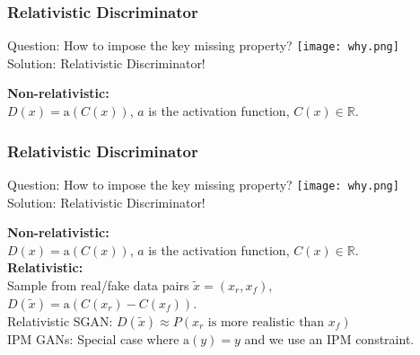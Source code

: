 \documentclass[t]{beamer}
\begin{document}
\begin{frame}
	\frametitle{Relativistic Discriminator}
	Question: How to impose the key missing property? \texttt{[image: why.png]} \\
	Solution: Relativistic Discriminator! \vspace{.25cm}
	
	\textbf{Non-relativistic:} \\ $D(x)=\text{a}(C(x))$, $a$ is the activation function, $C(x) \in \mathbb{R}$. \\ \vspace{.10cm}
	
\end{frame}


\begin{frame}
	\frametitle{Relativistic Discriminator}
	Question: How to impose the key missing property? \texttt{[image: why.png]} \\
	Solution: Relativistic Discriminator! \vspace{.25cm}
	
	\textbf{Non-relativistic:} \\ $D(x)=\text{a}(C(x))$, $a$ is the activation function, $C(x) \in \mathbb{R}$. \\ \vspace{.10cm}
	\textbf{Relativistic:} \\ Sample from real/fake data pairs $\tilde{x}=(x_r,x_f)$, $D(\tilde{x}) = \text{a}(C(x_r)-C(x_f))$. \\
	Relativistic SGAN: $D(\tilde{x}) \approx P(x_r \text{ is more realistic than } x_f)$ \\
	IPM GANs: Special case where $\text{a}(y)=y$ and we use an IPM constraint. \\ \vspace{.10cm}
	
\end{frame}

\end{document}
